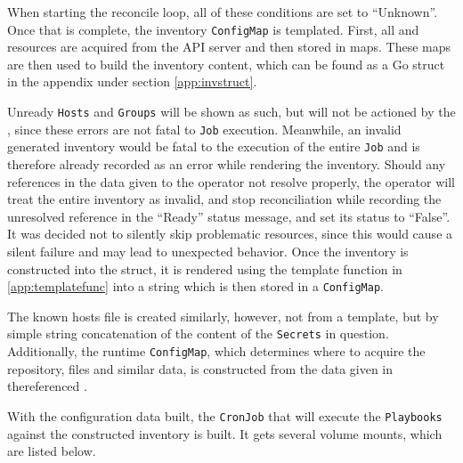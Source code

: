 When starting the reconcile loop, all of these conditions are set to \enquote{Unknown}.
Once that is complete, the inventory \texttt{ConfigMap} is templated.
First, all \anhost and \angroup resources are acquired from the API server and then stored in maps.
These maps are then used to build the inventory content, which can be found as a Go struct in the appendix under section \ref{app:invstruct}.

Unready \texttt{Hosts} and \texttt{Groups} will be shown as such, but will not be actioned by the \anrecjob, since these errors are not fatal to \texttt{Job} execution.
Meanwhile, an invalid generated inventory would be fatal to the execution of the entire \texttt{Job} and is therefore already recorded as an error while rendering the inventory.
Should any references in the data given to the operator not resolve properly, the operator will treat the entire inventory as invalid, and stop reconciliation while recording the unresolved reference in the \enquote{Ready} status message, and set its status to \enquote{False}.
It was decided not to silently skip problematic resources, since this would cause a silent failure and may lead to unexpected behavior.
Once the inventory is constructed into the struct, it is rendered using the template function in \ref{app:templatefunc} into a string which is then stored in a \texttt{ConfigMap}.

\clearpage
The known hosts file is created similarly, however, not from a template, but by simple string concatenation of the content of the \texttt{Secrets} in question.
Additionally, the runtime \texttt{ConfigMap}, which determines where to acquire the repository, files and similar data, is constructed from the data given in the\linebreak referenced \anplaybook.

With the configuration data built, the \texttt{CronJob} that will execute the \texttt{Playbooks} against the constructed inventory is built.
It gets several volume mounts, which are listed below.

